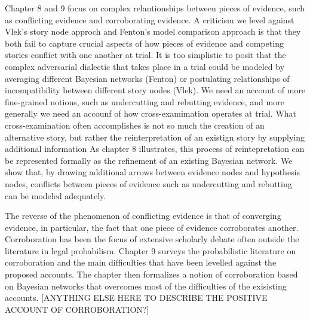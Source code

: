 \documentclass[10pt,dvipsnames,enabledeprecatedfontcommands]{scrartcl}
\begin{document}
Chapter 8 and 9 focus on complex relantionships between pieces of
evidence, such as conflicting evidence and corroborating evidence. A
criticism we level against Vlek's story node approch and Fenton's model
comparison approach is that they both fail to capture crucial aspects of
how pieces of evidence and competing stories conflict with one another
at trial. It is too simplistic to posit that the complex adversarial
dialectic that takes place in a trial could be modeled by averaging
different Bayesian networks (Fenton) or postulating relationships of
incompatibility between different story nodes (Vlek). We need an account
of more fine-grained notions, such as undercutting and rebutting
evidence, and more generally we need an accounf of how cross-examimation
operates at trial. What cross-examination often accomplishes is not so
much the creation of an alternative story, but rather the
reinterpretation of an existign story by supplying additional
information As chapter 8 illustrates, this process of reintepretation
can be represented formally as the refinement of an existing Bayesian
network. We show that, by drawing additional arrows between evidence
nodes and hypothesis nodes, conflicts between pieces of evidence such as
undercutting and rebutting can be modeled adequately.

The reverse of the phenomenon of conflicting evidence is that of
converging evidence, in particular, the fact that one piece of evidence
corroborates another. Corroboration has been the focus of extensive
scholarly debate often outside the literature in legal probabilism.
Chapter 9 surveys the probabilistic literature on corroboration and the
main difficulties that have been levelled against the proposed accounts.
The chapter then formalizes a notion of corroboration based on Bayesian
networks that overcomes most of the difficulties of the exisisting
accounts. {[}ANYTHING ELSE HERE TO DESCRIBE THE POSITIVE ACCOUNT OF
CORROBORATION?{]}
\end{document}
